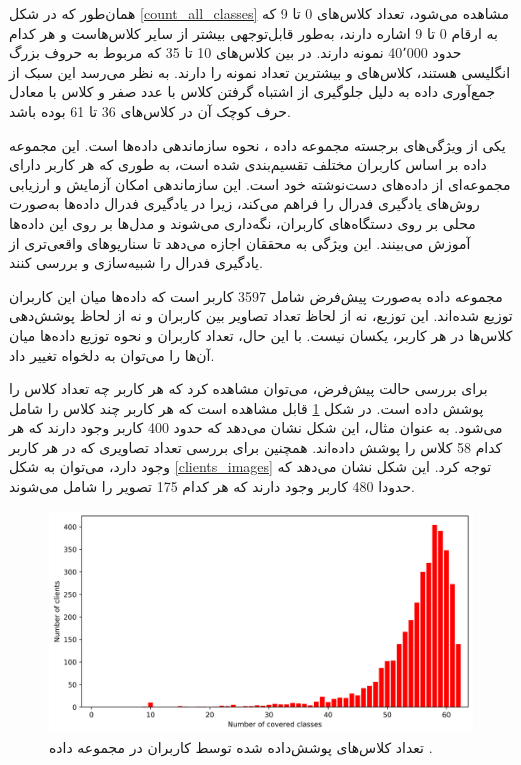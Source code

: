 همان‌طور که در شکل
\ref{count_all_classes}
مشاهده می‌شود، تعداد کلاس‌های 0 تا 9 که به ارقام 0 تا 9 اشاره دارند، به‌طور قابل‌توجهی بیشتر از سایر کلاس‌هاست و هر کدام حدود 40٬000 نمونه دارند. در بین کلاس‌های 10 تا 35 که مربوط به حروف بزرگ انگلیسی هستند، کلاس‌های  و  بیشترین تعداد نمونه را دارند. به نظر می‌رسد این سبک از جمع‌آوری داده به دلیل جلوگیری از اشتباه گرفتن کلاس  با عدد صفر و کلاس  با معادل حرف کوچک آن در کلاس‌های 36 تا 61 بوده باشد.


یکی از ویژگی‌های برجسته مجموعه داده
،
نحوه سازماندهی داده‌ها است. این مجموعه داده بر اساس کاربران مختلف تقسیم‌بندی شده است، به طوری که هر کاربر دارای مجموعه‌ای از داده‌های دست‌نوشته خود است. این سازماندهی امکان آزمایش و ارزیابی روش‌های یادگیری فدرال را فراهم می‌کند، زیرا در یادگیری فدرال داده‌ها به‌صورت محلی بر روی دستگاه‌های کاربران، نگه‌داری می‌شوند و مدل‌ها بر روی این داده‌ها آموزش می‌بینند. این ویژگی به محققان اجازه می‌دهد تا سناریوهای واقعی‌تری از یادگیری فدرال را شبیه‌سازی و بررسی کنند.

مجموعه داده
به‌صورت پیش‌فرض شامل 3597 کاربر است که داده‌ها میان این کاربران توزیع شده‌اند. این توزیع، نه از لحاظ تعداد تصاویر بین کاربران و نه از لحاظ پوشش‌دهی کلاس‌ها در هر کاربر، یکسان نیست. با این حال، تعداد کاربران و نحوه توزیع داده‌ها میان آن‌ها را می‌توان به دلخواه تغییر داد.

برای بررسی حالت پیش‌فرض، می‌توان مشاهده کرد که هر کاربر چه تعداد کلاس را پوشش داده است. در شکل
\ref{clients_cover_classes}
قابل مشاهده است که هر کاربر چند کلاس را شامل می‌شود. به عنوان مثال، این شکل نشان می‌دهد که حدود 400 کاربر وجود دارند که هر کدام 58 کلاس را پوشش داده‌اند. همچنین برای بررسی تعداد تصاویری که در هر کاربر وجود دارد، می‌توان به شکل
\ref{clients_images}
توجه کرد. این شکل نشان می‌دهد که حدودا 480 کاربر وجود دارند که هر کدام 175 تصویر را شامل می‌شوند.



\begin{figure}[t]
	\centering
	\includegraphics[scale=0.7]{images/chap5/clients_cover_classes.png}%
	\caption{%
تعداد کلاس‌های پوشش‌داده شده توسط کاربران در مجموعه داده
		.
	}
	\label{clients_cover_classes}
	\centering
\end{figure}


